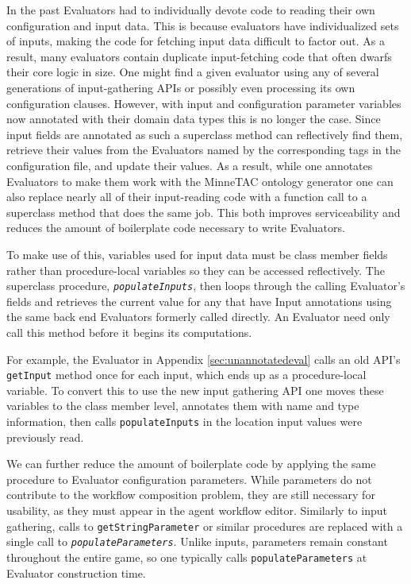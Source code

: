 \documentclass{article}
\begin{document}
In the past Evaluators had to individually devote code to reading their own configuration and input data.
This is because evaluators have individualized sets of inputs, making the code for fetching input data difficult to factor out.
As a result, many evaluators contain duplicate input-fetching code that often dwarfs their core logic in size.
One might find a given evaluator using any of several generations of input-gathering APIs or possibly even processing its own configuration clauses.
However, with input and configuration parameter variables now annotated with their domain data types this is no longer the case.
Since input fields are annotated as such a superclass method can reflectively find them, retrieve their values from the Evaluators named by the corresponding tags in the configuration file, and update their values.
As a result, while one annotates Evaluators to make them work with the MinneTAC ontology generator one can also replace nearly all of their input-reading code with a function call to a superclass method that does the same job.
This both improves serviceability and reduces the amount of boilerplate code necessary to write Evaluators.

To make use of this, variables used for input data must be class member fields rather than procedure-local variables so they can be accessed reflectively.
The superclass procedure, \emph{\texttt{populateInputs}}, then loops through the calling Evaluator's fields and retrieves the current value for any that have Input annotations using the same back end Evaluators formerly called directly.
An Evaluator need only call this method before it begins its computations.

For example, the Evaluator in Appendix \ref{sec:unannotatedeval} calls an old API's \texttt{getInput} method once for each input, which ends up as a procedure-local variable.
To convert this to use the new input gathering API one moves these variables to the class member level, annotates them with name and type information, then calls \texttt{populateInputs} in the location input values were previously read.

We can further reduce the amount of boilerplate code by applying the same procedure to Evaluator configuration parameters.
While parameters do not contribute to the workflow composition problem, they are still necessary for usability, as they must appear in the agent workflow editor.
Similarly to input gathering, calls to \texttt{getStringParameter} or similar procedures are replaced with a single call to \emph{\texttt{populateParameters}}.
Unlike inputs, parameters remain constant throughout the entire game, so one typically calls \texttt{populateParameters} at Evaluator construction time.
\end{document}
